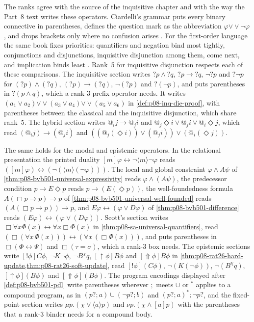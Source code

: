 The ranks agree with the source of the inquisitive chapter and with the
way the Part~8 text writes these operators.  Ciardelli's grammar puts every
binary connective in parentheses, defines the question mark as the
abbreviation \(\varphi\mathbin{\vee\!\vee}\neg\varphi\)
\cite[Definitions~3.2.1--3.2.2, p.~60]{Ciardelli2023InquisitivePropositional},
and drops brackets only where no confusion arises
\cite[\S3.1, p.~57]{Ciardelli2023InquisitivePropositional}.  For the
first-order language the same book fixes priorities: quantifiers and
negation bind most tightly, conjunctions and disjunctions, inquisitive
disjunction among them, come next, and implication binds least
\cite[\S5.1, pp.~125--126]{Ciardelli2023InquisitivePropositional}.
Rank~5 for inquisitive disjunction respects each of these comparisons.  The
inquisitive section writes \(?p\land?q\), \(?p\to?q\), \(\neg?p\) and
\(?\neg p\) for \((?p)\land(?q)\), \((?p)\to(?q)\), \(\neg(?p)\) and
\(?(\neg p)\), and puts parentheses in \(?(p\land q)\), which a rank-3
prefix operator needs.  It writes
\((a_1\lor a_2)\mathbin{\vee\!\vee}(a_3\lor a_4)\mathbin{\vee\!\vee}(a_5\lor a_6)\)
in \cref{def:p08-inq-die-proof}, with parentheses between the classical
and the inquisitive disjunction, which share rank~5.  The hybrid section
writes \(@_ij\to@_ji\) and \(@_j\Diamond i\lor@_ji\lor@_i\Diamond j\), which
read \((@_ij)\to(@_ji)\) and
\(((@_j(\Diamond i))\lor(@_ji))\lor(@_i(\Diamond j))\).

The same holds for the modal and epistemic operators.  In the relational
presentation the printed duality
\([m]\varphi\leftrightarrow\neg\langle m\rangle\neg\varphi\) reads
\(([m]\varphi)\leftrightarrow(\neg(\langle m\rangle(\neg\varphi)))\).  The
local and global constraint \(\varphi\land A\psi\) of
\cref{thm:p08-bvb501-universal-expressivity} reads
\(\varphi\land(A\psi)\), the predecessor condition \(p\to E\Diamond p\)
reads \(p\to(E(\Diamond p))\), the well-foundedness formula
\(A(\Box p\to p)\to p\) of \cref{thm:p08-bvb501-universal-well-founded}
reads \((A(\Box p\to p))\to p\), and
\(E\varphi\leftrightarrow(\varphi\lor D\varphi)\) of
\cref{thm:p08-bvb501-difference} reads
\((E\varphi)\leftrightarrow(\varphi\lor(D\varphi))\).  Scott's section writes
\(\Box\forall x\Phi(x)\leftrightarrow\forall x\Box\Phi(x)\) in
\cref{thm:p08-sa-universal-quantifiers}, read
\((\Box(\forall x\,\Phi(x)))\leftrightarrow(\forall x\,(\Box\Phi(x)))\),
and puts parentheses in \(\Box(\Phi\leftrightarrow\Psi)\) and
\(\Box(\tau=\sigma)\), which a rank-3 box needs.  The epistemic sections
write \([!\phi]C\phi\), \(\neg K\neg\phi\), \(\neg B^\chi q\),
\([\uparrow\phi]B\phi\) and \([\Uparrow\phi]B\phi\) in
\cref{thm:p08-rat26-hard-update,thm:p08-rat26-soft-update}, read
\([!\phi](C\phi)\), \(\neg(K(\neg\phi))\), \(\neg(B^\chi q)\),
\([\uparrow\phi](B\phi)\) and \([\Uparrow\phi](B\phi)\).  The program
encodings displayed after \cref{def:p08-bvb501-pdl} write parentheses
wherever \(;\) meets \(\cup\) or \({}^*\) applies to a compound program, as
in \((p?;a)\cup(\neg p?;b)\) and \((p?;a)^*;\neg p?\), and the
fixed-point section writes \(\mu p.(\chi\lor\langle a\rangle p)\) and
\(\nu p.(\chi\land[a]p)\) with the parentheses that a rank-3 binder needs
for a compound body.

